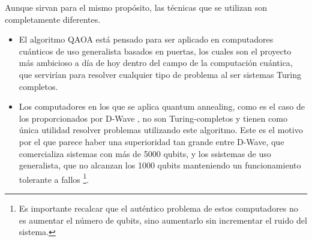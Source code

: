 \documentclass{article}
\begin{document}
Aunque sirvan para el mismo propósito, las técnicas que se utilizan son completamente diferentes.
\begin{itemize}
\item El algoritmo QAOA está pensado para ser aplicado en computadores cuánticos de uso generalista basados en puertas, los cuales son el proyecto más ambicioso a día de hoy dentro del campo de la computación cuántica, que servirían para resolver cualquier tipo de problema al ser sistemas Turing completos. 
\item Los computadores en los que se aplica quantum annealing, como es el caso de los proporcionados por D-Wave  %
  , no son Turing-completos y tienen como única utilidad resolver problemas utilizando este algoritmo. Este es el motivo por el que parece haber una superioridad tan grande entre D-Wave, que comercializa sistemas con más de 5000 qubits, y los ssistemas de uso generalista, que no alcanzan los 1000 qubits manteniendo un funcionamiento tolerante a fallos \footnote{Es importante recalcar que el auténtico problema de estos computadores no es aumentar el número de qubits, sino aumentarlo sin incrementar el ruido del sistema.}.
\end{itemize}




\end{document}
